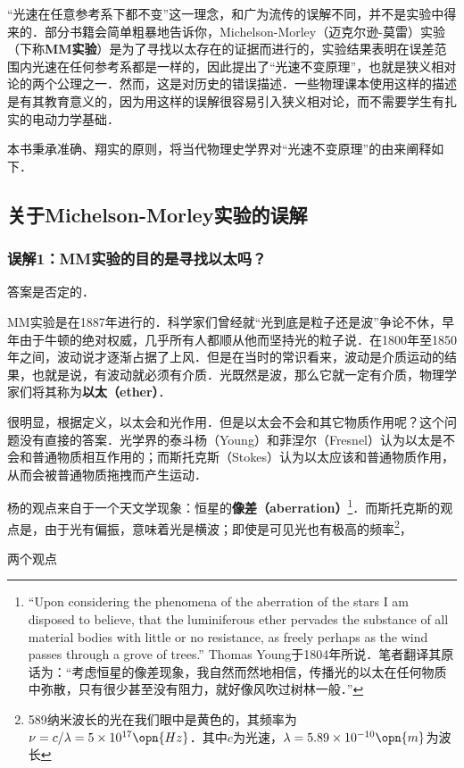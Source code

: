 
“光速在任意参考系下都不变”这一理念，和广为流传的误解不同，并不是实验中得来的．部分书籍会简单粗暴地告诉你，Michelson-Morley（迈克尔逊-莫雷）实验（下称\textbf{MM实验}）是为了寻找以太存在的证据而进行的，实验结果表明在误差范围内光速在任何参考系都是一样的，因此提出了“光速不变原理”，也就是狭义相对论的两个公理之一．然而，这是对历史的错误描述．一些物理课本使用这样的描述是有其教育意义的，因为用这样的误解很容易引入狭义相对论，而不需要学生有扎实的电动力学基础．

本书秉承准确、翔实的原则，将当代物理史学界对“光速不变原理”的由来阐释如下．

\subsection{关于Michelson-Morley实验的误解}

\subsubsection{误解1：MM实验的目的是寻找以太吗？}

答案是否定的．

MM实验是在1887年进行的．科学家们曾经就“光到底是粒子还是波”争论不休，早年由于牛顿的绝对权威，几乎所有人都顺从他而坚持光的粒子说．在1800年至1850年之间，波动说才逐渐占据了上风．但是在当时的常识看来，波动是介质运动的结果，也就是说，有波动就必须有介质．光既然是波，那么它就一定有介质，物理学家们将其称为\textbf{以太（ether）}．

很明显，根据定义，以太会和光作用．但是以太会不会和其它物质作用呢？这个问题没有直接的答案．光学界的泰斗杨（Young）和菲涅尔（Fresnel）认为以太是不会和普通物质相互作用的；而斯托克斯（Stokes）认为以太应该和普通物质作用，从而会被普通物质拖拽而产生运动．

杨的观点来自于一个天文学现象：恒星的\textbf{像差（aberration）}\footnote{“Upon considering the phenomena
of the aberration of the stars I am disposed to believe, that the luminiferous ether pervades the substance of all material bodies with little or no resistance, as freely perhaps as the wind passes through a grove of trees.” Thomas Young于1804年所说．笔者翻译其原话为：“考虑恒星的像差现象，我自然而然地相信，传播光的以太在任何物质中弥散，只有很少甚至没有阻力，就好像风吹过树林一般．”}．而斯托克斯的观点是，由于光有偏振，意味着光是横波；即使是可见光也有极高的频率\footnote{589纳米波长的光在我们眼中是黄色的，其频率为$\nu=c/\lambda=5\times10^{17}\opn{Hz}$．其中$c$为光速，$\lambda=5.89\times10^{-10}\opn{m}$为波长}，%

两个观点


